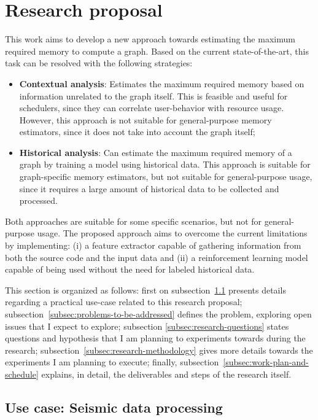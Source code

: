 \section{Research proposal}
\label{sec:research-proposal}

This work aims to develop a new approach towards estimating the maximum required memory to compute a graph.
Based on the current state-of-the-art, this task can be resolved with the following strategies:

\begin{itemize}
  \item \textbf{Contextual analysis}: Estimates the maximum required memory based on information unrelated to the graph itself.
    This is feasible and useful for schedulers, since they can correlate user-behavior with resource usage.
    However, this approach is not suitable for general-purpose memory estimators, since it does not take into account the graph itself;
  \item \textbf{Historical analysis}: Can estimate the maximum required memory of a graph by training a model using historical data.
    This approach is suitable for graph-specific memory estimators, but not suitable for general-purpose usage, since it requires a large amount of historical data to be collected and processed.
\end{itemize}

Both approaches are suitable for some specific scenarios, but not for general-purpose usage.
The proposed approach aims to overcome the current limitations by implementing:
(i) a feature extractor capable of gathering information from both the source code and the input data and
(ii) a reinforcement learning model capable of being used without the need for labeled historical data.

This section is organized as follows:
first on subsection~\ref{subsec:use-case} presents details regarding a practical use-case related to this research proposal;
subsection~\ref{subsec:problems-to-be-addressed} defines the problem, exploring open issues that I expect to explore;
subsection \ref{subsec:research-questions} states questions and hypothesis that I am planning to experiments towards during the research;
subsection~\ref{subsec:research-methodology} gives more details towards the experiments I am planning to execute;
finally, subsection~\ref{subsec:work-plan-and-schedule} explains, in detail, the deliverables and steps of the research itself.

\subsection{Use case: Seismic data processing}
\label{subsec:use-case}


